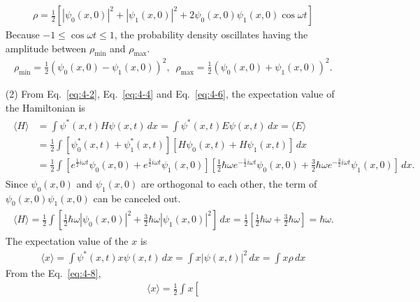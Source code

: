\documentclass[floatfix,nofootinbib,superscriptaddress,fleqn]{revtex4-2}
\begin{document}
\begin{itemize}
\begin{align}
    \rho =\frac{1}{2}\left[
      |\psi_0(x,0)|^2+|\psi_1(x,0)|^2
      +2\psi_0(x,0)\psi_1(x,0)\cos{\omega t}\right]
  \end{align}
  Because $-1\leq \cos{\omega t}\leq 1$, the probability density oscillates
  having the amplitude between $\rho_{\mathrm{min}}$ and $\rho_{\mathrm{max}}$.
  \begin{align}
    \rho_{\min} = \frac{1}{2}\left(\psi_0(x,0)-\psi_1(x,0)
      \right)^2,\,\,\,
      \rho_{\max} = \frac{1}{2}\left(\psi_0(x,0)+\psi_1(x,0)
      \right)^2.
  \end{align}
  \item[(2)]
   From Eq.~\eqref{eq:4-2}, Eq.~\eqref{eq:4-4} and Eq.~\eqref{eq:4-6}, 
   the expectation value of the Hamiltonian is
  \begin{align}
    \begin{split}
      \langle H \rangle &= \int \psi^*(x,t)H\psi(x,t)\,dx
      = \int \psi^*(x,t)E\psi(x,t)\,dx
      =\langle E \rangle  \\
      &=\frac{1}{2}\int
      [\psi_0^*(x,t) + \psi_1^*(x,t)][H\psi_0(x,t) + H\psi_1(x,t)]
      \,dx \\
      &=\frac{1}{2}\int
      \left[e^{\frac{1}{2}i\omega t}\psi_0(x,0) 
      + e^{\frac{3}{2}i\omega t}\psi_1(x,0)\right]
      \left[\frac{1}{2}\hbar\omega e^{-\frac{1}{2}i\omega t}\psi_0(x,0) 
      + \frac{3}{2}\hbar\omega 
      e^{-\frac{3}{2}i\omega t}\psi_1(x,0)\right]
      \,dx.
    \end{split}
  \end{align}
  Since $\psi_0(x,0)$ and $\psi_1(x,0)$ are orthogonal to each other,
  the term of $\psi_0(x,0)\psi_1(x,0)$ can be canceled out.
  \begin{align}\label{eq:4-9}
    \begin{split}
      \langle H \rangle = \frac{1}{2}\int
      \left[\frac{1}{2}\hbar\omega |\psi_0(x,0)|^2 
      + \frac{3}{2}\hbar\omega |\psi_1(x,0)|^2\right]
      \,dx
      =\frac{1}{2}\left[\frac{1}{2}\hbar\omega
      +\frac{3}{2}\hbar\omega\right]
      =\hbar\omega.
    \end{split}
  \end{align}
  The expectation value of the $x$ is
  \begin{align}
    \langle x \rangle = \int \psi^*(x,t)x\psi(x,t)\,dx
    =\int x|\psi(x,t)|^2\,dx=\int x\rho\,dx
  \end{align}
  From the Eq.~\eqref{eq:4-8},
  \begin{align}\label{eq:4-11}
    \langle x \rangle=\frac{1}{2}\int x\left[

\end{align}
\end{itemize}
\end{document}
